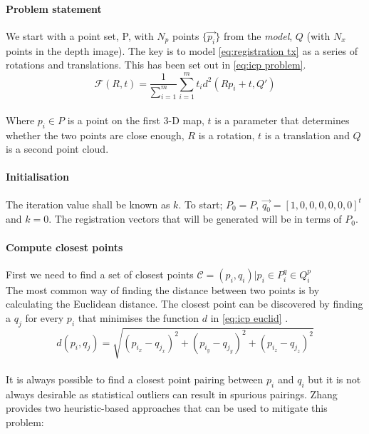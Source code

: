 \paragraph{Problem statement}
We start with a point set, P, with $N_p$ points ${\{\vec{p_i}\}}$ from the \emph{model}, $Q$ (with $N_x$ points in the depth image). The key is to model \ref{eq:registration tx} as a series of rotations and translations. This has been set out in \ref{eq:icp problem}.   \\

\begin{equation}
    \label{eq:icp problem}
    \mathcal{F}(R,t) = \frac{1}{\sum^m_{i=1}}\sum\limits^m_{i=1}t_id^2(Rp_i+t, Q')
\end{equation} \\

Where $p_i \in P$ is a point on the first 3-D map, $t$ is a parameter that determines whether the two points are close enough, $R$ is a rotation, $t$ is a translation and $Q$ is a second point cloud. 

\paragraph{Initialisation}
The iteration value shall be known as $k$. To start; $P_0=P$, $\vec{q_0} = [1,0,0,0,0,0,0]^t$ and $k=0$. The registration vectors that will be generated will be in terms of $P_0$. \\

\paragraph{Compute closest points}
First we need to find a set of closest points $\mathcal{C} = {(p_i, q_i)|p_i \in P ^ q_i \in Q ^ p_i}$ \\

The most common way of finding the distance between two points is by calculating the Euclidean distance. The closest point can be discovered by finding a $q_j$ for every $p_i$ that minimises the function $d$ in \ref{eq:icp euclid} \cite{besl92,zhang94}. \\

\begin{equation}
    \label{eq:icp euclid}
    d(p_i,q_j) = \sqrt{(p_i_x - q_j_x)^2 + (p_i_y - q_j_y)^2 + (p_i_z - q_j_z)^2}
\end{equation} \\

It is always possible to find a closest point pairing between $p_i$ and $q_i$ but it is not always desirable as statistical outliers can result in spurious pairings. Zhang \cite{zhang94} provides two heuristic-based approaches that can be used to mitigate this problem: \\

